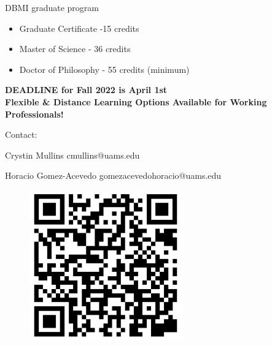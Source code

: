 \documentclass[11pt, aspectratio=43]{beamer}
\begin{document}
	\begin{frame}{DBMI graduate program}
		
		\begin{itemize}
			\item Graduate Certificate -15 credits
			\item Master of Science - 36 credits
			\item Doctor of Philosophy - 55 credits (minimum)
		\end{itemize}
		
		
		\begin{center}
			\textbf{ DEADLINE  for Fall 2022  is April 1st} \\
			\textbf{Flexible \& Distance Learning Options Available for Working Professionals!}

		\end{center}
		Contact:
		
		
		Crystin Mullins cmullins@uams.edu
		
		Horacio Gomez-Acevedo gomezacevedohoracio@uams.edu
		
				\begin{figure}[h]
			\centering
			\includegraphics[scale=0.45]{Figures/qr_code_new.png}
		\end{figure}
		
	\end{frame}
	
\end{document}
